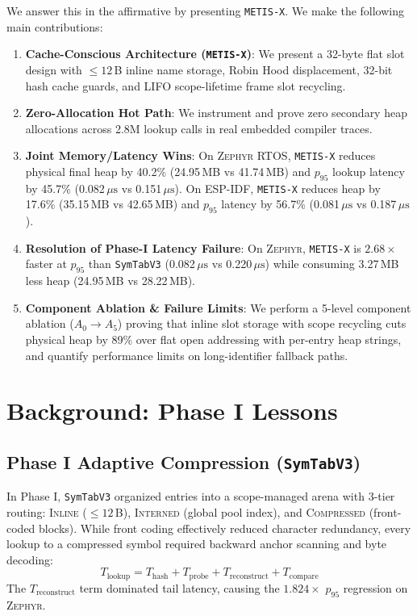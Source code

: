 \documentclass[conference]{IEEEtran}
\begin{document}
We answer this in the affirmative by presenting \texttt{METIS-X}. We make the following main contributions:
\begin{enumerate}
    \item \textbf{Cache-Conscious Architecture (\texttt{METIS-X})}: We present a 32-byte flat slot design with $\le 12$\,B inline name storage, Robin Hood displacement, 32-bit hash cache guards, and LIFO scope-lifetime frame slot recycling.
    \item \textbf{Zero-Allocation Hot Path}: We instrument and prove zero secondary heap allocations across 2.8M lookup calls in real embedded compiler traces.
    \item \textbf{Joint Memory/Latency Wins}: On \textsc{Zephyr} RTOS, \texttt{METIS-X} reduces physical final heap by 40.2\% (24.95\,MB vs 41.74\,MB) and $p_{95}$ lookup latency by 45.7\% (0.082\,$\mu\text{s}$ vs 0.151\,$\mu\text{s}$). On \textsc{ESP-IDF}, \texttt{METIS-X} reduces heap by 17.6\% (35.15\,MB vs 42.65\,MB) and $p_{95}$ latency by 56.7\% (0.081\,$\mu\text{s}$ vs 0.187\,$\mu\text{s}$).
    \item \textbf{Resolution of Phase-I Latency Failure}: On \textsc{Zephyr}, \texttt{METIS-X} is $2.68\times$ faster at $p_{95}$ than \texttt{SymTabV3} (0.082\,$\mu\text{s}$ vs 0.220\,$\mu\text{s}$) while consuming 3.27\,MB less heap (24.95\,MB vs 28.22\,MB).
    \item \textbf{Component Ablation \& Failure Limits}: We perform a 5-level component ablation ($A_0 \to A_5$) proving that inline slot storage with scope recycling cuts physical heap by 89\% over flat open addressing with per-entry heap strings, and quantify performance limits on long-identifier fallback paths.
\end{enumerate}

\section{Background: Phase I Lessons}

\subsection{Phase I Adaptive Compression (\texttt{SymTabV3})}
In Phase I, \texttt{SymTabV3} organized entries into a scope-managed arena with 3-tier routing: \textsc{Inline} ($\le 12$\,B), \textsc{Interned} (global pool index), and \textsc{Compressed} (front-coded blocks). While front coding effectively reduced character redundancy, every lookup to a compressed symbol required backward anchor scanning and byte decoding:
\begin{equation}
T_{\text{lookup}} = T_{\text{hash}} + T_{\text{probe}} + T_{\text{reconstruct}} + T_{\text{compare}}
\end{equation}
The $T_{\text{reconstruct}}$ term dominated tail latency, causing the $1.824\times$ $p_{95}$ regression on \textsc{Zephyr}.
\end{document}
